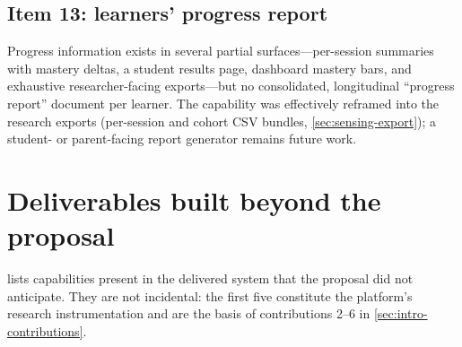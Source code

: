\subsection{Item 13: learners' progress report}
\label{sec:scope-item13}

Progress information exists in several partial surfaces---per-session
summaries with mastery deltas, a student results page, dashboard mastery
bars, and exhaustive researcher-facing exports---but no consolidated,
longitudinal ``progress report'' document per learner. The capability
was effectively reframed into the research exports (per-session and
cohort CSV bundles, \cref{sec:sensing-export}); a student- or
parent-facing report generator remains future work.

\section{Deliverables built beyond the proposal}
\label{sec:scope-new}

 lists capabilities present in the delivered system
that the proposal did not anticipate. They are not incidental: the first
five constitute the platform's research instrumentation and are the basis
of contributions 2--6 in \cref{sec:intro-contributions}.

